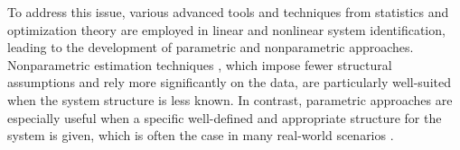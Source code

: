 % 
% 
% 
To address this issue, various advanced tools and techniques from statistics and optimization theory are employed in linear and nonlinear system identification, leading to the development of parametric and nonparametric approaches. Nonparametric estimation techniques \cite{khosravi2022Lut,zorzi2022nonparametric,khosravi2021ROA,khosravi2021grad}, which impose fewer structural assumptions and rely more significantly on the data, are particularly well-suited when the system structure is less known. In contrast, parametric approaches are especially useful when a specific well-defined and appropriate structure for the system is given, which is often the case in many real-world scenarios \cite{astrom1979maximum,bremaud2012introduction,little2019statistical}.










